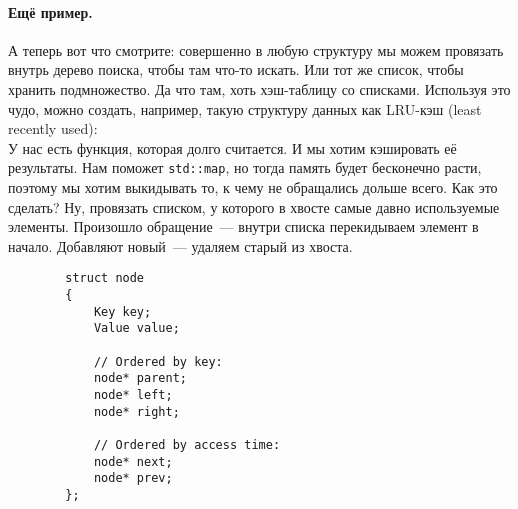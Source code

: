 \documentclass{article}
\begin{document}
    \paragraph{Ещё пример.}
    А теперь вот что смотрите: совершенно в любую структуру мы можем провязать внутрь дерево поиска, чтобы там что-то искать. Или тот же список, чтобы хранить подмножество. Да что там, хоть хэш-таблицу со списками. Используя это чудо, можно создать, например, такую структуру данных как LRU-кэш (least recently used):\\
    У нас есть функция, которая долго считается. И мы хотим кэшировать её результаты. Нам поможет \texttt{std::map}, но тогда память будет бесконечно расти, поэтому мы хотим выкидывать то, к чему не обращались дольше всего. Как это сделать? Ну, провязать списком, у которого в хвосте самые давно используемые элементы. Произошло обращение~--- внутри списка перекидываем элемент в начало. Добавляют новый~--- удаляем старый из хвоста.
    \begin{verbatim}
        struct node
        {
            Key key;
            Value value;

            // Ordered by key:
            node* parent;
            node* left;
            node* right;

            // Ordered by access time:
            node* next;
            node* prev;
        };
    \end{verbatim}
\end{document}
